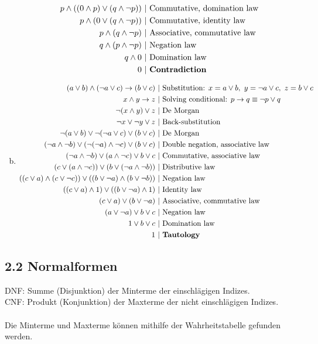 \documentclass[12pt,a4paper]{article}
\begin{document}
\begin{enumerate}[a)]
\begin{align*}
p \land ((0 \land p)\lor (q \land \neg p))~&|~\text{Commutative, domination law}\\
p \land (0 \lor (q \land \neg p))~&|~\text{Commutative, identity law}\\
p \land (q \land \neg p)~&|~\text{Associative, commutative law}\\
q \land (p \land \neg p)~&|~\text{Negation law}\\
q \land 0~&|~\text{Domination law}\\
0~&|~\text{\textbf{Contradiction}}
\end{align*}
\item
\begin{align*}
(a \lor b) \land (\neg a \lor c) \rightarrow (b \lor c)~&|~\text{Substitution: } x = a \lor b,~y=\neg a \lor c,~z = b\lor c\\
x \land y \rightarrow z~&|~\text{Solving conditional: } p \rightarrow q \equiv \neg p \lor q\\
\neg (x \land y) \lor z~&|~\text{De Morgan}\\
\neg x \lor \neg y \lor z~&|~\text{Back-substitution}\\
\neg (a \lor b) \lor \neg (\neg a \lor c) \lor (b \lor c)~&|~\text{De Morgan}\\
(\neg a \land \neg b) \lor (\neg (\neg a) \land \neg c) \lor (b \lor c)~&|~\text{Double negation, associative law}\\
(\neg a \land \neg b) \lor (a \land \neg c) \lor b \lor c~&|~\text{Commutative, associative law}\\
(c \lor (a \land \neg c)) \lor (b \lor (\neg a \land \neg b))~&|~\text{Distributive law}\\
((c \lor a)\land (c \lor \neg c)) \lor ((b \lor \neg a)\land (b\lor \neg b))~&|~\text{Negation law}\\
((c\lor a)\land 1) \lor ((b \lor \neg a)\land 1)~&|~\text{Identity law}\\
(c \lor a)\lor (b \lor \neg a)~&|~\text{Associative, commutative law}\\
(a \lor \neg a) \lor b \lor c~&|~\text{Negation law}\\
1 \lor b \lor c~&|~\text{Domination law}\\
1~&|~\text{\textbf{Tautology}}
\end{align*}
\end{enumerate}
\subsection*{2.2 Normalformen}
DNF: Summe (Disjunktion) der Minterme der einschlägigen Indizes.\\
CNF: Produkt (Konjunktion) der Maxterme der nicht einschlägigen Indizes.\\
\\
Die Minterme und Maxterme können mithilfe der Wahrheitstabelle gefunden werden.\\
\end{document}
